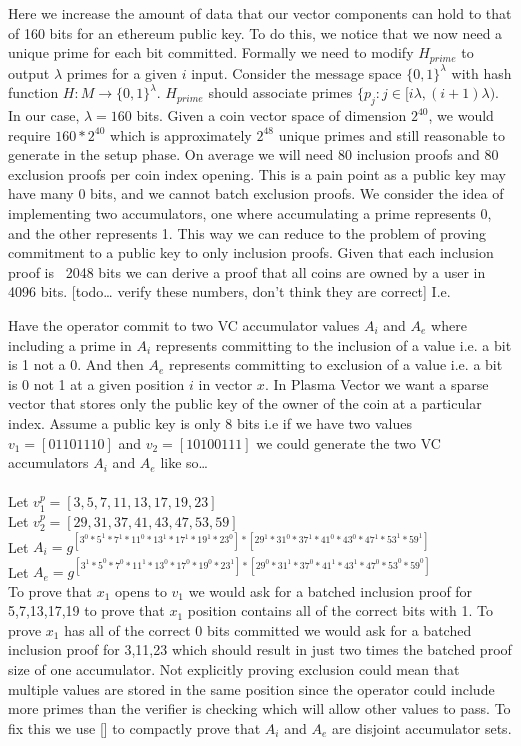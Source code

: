 \documentclass[11pt]{article}
\begin{document}
Here we increase the amount of data that our vector components can hold to that of 160 bits for an ethereum public key. To do this, we notice that we now need a unique prime for each bit committed. Formally we need to modify $H_{prime}$ to output $\lambda$ primes for a given $i$ input. Consider the message space $\{0,1\}^{\lambda}$ with hash function $H: M \rightarrow \{0,1\}^{\lambda}$. $H_{prime}$ should associate primes $\{p_j: j \in [i\lambda,(i+1)\lambda)$. In our case, $\lambda = 160$ bits. Given a coin vector space of dimension $2^{40}$, we would require $160*2^{40}$ which is approximately $2^{48}$ unique primes and still reasonable to generate in the setup phase. On average we will need 80 inclusion proofs and 80 exclusion proofs per coin index opening. This is a pain point as a public key may have many 0 bits, and we cannot batch exclusion proofs. We consider the idea of implementing two accumulators, one where accumulating a prime represents 0, and the other represents 1. This way we can reduce to the problem of proving commitment to a public key to only inclusion proofs. Given that each inclusion proof is ~2048 bits we can derive a proof that all coins are owned by a user in 4096 bits. [todo… verify these numbers, don’t think they are correct] I.e.

Have the operator commit to two VC accumulator values $A_i$ and $A_e$ where including a prime in $A_i$ represents committing to the inclusion of a value i.e. a bit is 1 not a 0. And then $A_e$ represents committing to exclusion of a value i.e. a bit is 0 not 1 at a given position $i$ in vector $x$.
In Plasma Vector we want a sparse vector that stores only the public key of the owner of the coin at a particular index. Assume a public key is only 8 bits i.e if we have two values $v_1 = [01101110]$ and $v_2 = [10100111]$ we could generate the two VC accumulators $A_i$ and $A_e$ like so…
\\
\\
Let $v_1^p = [3,5,7,11,13,17,19,23]$
\\
Let $v_2^p = [29,31,37,41,43,47,53, 59]$
\\
Let $A_i = g^{[{3^0}*{5^1}*{7^1}*{11^0}*{13^1}*{17^1}*{19^1}*{23^0}]*[{29^1}*{31^0}*{37^1}*{41^0}*{43^0}*{47^1}*{53^1}*59^1]}$
\\
Let $A_e = g^{[{3^1}*{5^0}*{7^0}*{11^1}*{13^0}*{17^0}*{19^0}*{23^1}]*[{29^0}*{31^1}*{37^0}*{41^1}*{43^1}*{47^0}*{53^0}*59^0]}$
\\

To prove that $x_1$ opens to $v_1$ we would ask for a batched inclusion proof for 5,7,13,17,19 to prove that $x_1$ position contains all of the correct bits with 1. To prove $x_1$ has all of the correct 0 bits committed we would ask for a batched inclusion proof for 3,11,23 which should result in just two times the batched proof size of one accumulator. Not explicitly proving exclusion could mean that multiple values are stored in the same position since the operator could include more primes than the verifier is checking which will allow other values to pass. To fix this we use [] to compactly prove that $A_i$ and $A_e$ are disjoint accumulator sets.
\\
\\
\end{document}
